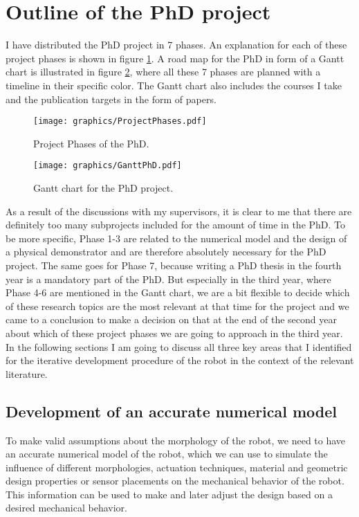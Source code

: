 \section{Outline of the PhD project} \label{sec:outline}
%
I have distributed the PhD project in 7 phases. An explanation for each of these project phases is shown in figure \ref{ProjectPhases}. A road map for the PhD in form of a Gantt
chart is illustrated in figure \ref{GanttPhD}, where all these 7 phases are planned with a timeline in their specific color. The Gantt chart also includes the courses I take
 and the publication targets in the form of papers. 
%
\begin{figure}[ht]
    \centering
    \texttt{[image: graphics/ProjectPhases.pdf]}
    \caption{Project Phases of the PhD.}
    \label{ProjectPhases}
   \end{figure}
%
\begin{figure}[ht]
    \centering
    \texttt{[image: graphics/GanttPhD.pdf]}
    \caption{Gantt chart for the PhD project.}
    \label{GanttPhD}
   \end{figure}   
%
As a result of the discussions with my supervisors, it is clear to me that there are definitely too many subprojects included for the amount of time in the PhD.
To be more specific, Phase 1-3 are related to the numerical model and the design of a physical demonstrator and are therefore absolutely necessary for the PhD project. 
The same goes for Phase 7, because writing a PhD thesis in the fourth year is a mandatory part of the PhD. But especially in the third year, where Phase 4-6 are mentioned
in the Gantt chart, we are a bit flexible to decide which of these research topics are the most relevant at that time for the project and we came to a conclusion to make a decision
on that at the end of the second year about which of these project phases we are going to approach in the third year. 
%
In the following sections I am going to discuss all three key areas that I identified for the iterative development procedure of the robot in the context of the relevant literature.
%
%
\subsection*{Development of an accurate numerical model}\label{sub:Model}
%
To make valid assumptions about the morphology of the robot, we need to have an accurate numerical model of the robot, which we can use to simulate the influence of different
morphologies, actuation techniques, material and geometric design properties or sensor placements on the mechanical behavior of the robot. This information can be used to
make and later adjust the design based on a desired mechanical behavior.    
%
